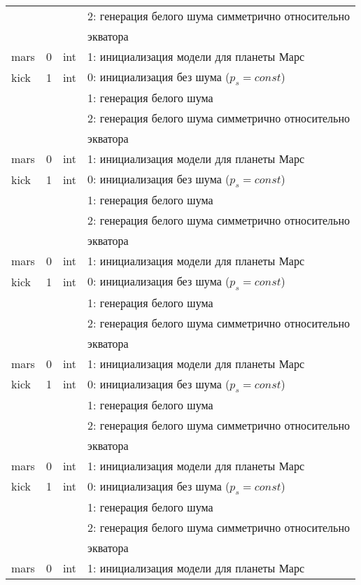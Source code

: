 \begin{longtable*}[c]{|l|c|l|l|}
      &   &     & 2: генерация белого шума симметрично относительно \\
  & & & экватора    \\
 mars & 0 & int & 1: инициализация модели для планеты Марс     \\
kick & 1 & int & 0: инициализация без шума (\(p_s = const\)) \\
      &   &     & 1: генерация белого шума                  \\
      &   &     & 2: генерация белого шума симметрично относительно \\
  & & & экватора    \\
 mars & 0 & int & 1: инициализация модели для планеты Марс     \\
kick & 1 & int & 0: инициализация без шума (\(p_s = const\)) \\
      &   &     & 1: генерация белого шума                  \\
      &   &     & 2: генерация белого шума симметрично относительно \\
  & & & экватора    \\
 mars & 0 & int & 1: инициализация модели для планеты Марс     \\
kick & 1 & int & 0: инициализация без шума (\(p_s = const\)) \\
      &   &     & 1: генерация белого шума                  \\
      &   &     & 2: генерация белого шума симметрично относительно \\
  & & & экватора    \\
 mars & 0 & int & 1: инициализация модели для планеты Марс     \\
kick & 1 & int & 0: инициализация без шума (\(p_s = const\)) \\
      &   &     & 1: генерация белого шума                  \\
      &   &     & 2: генерация белого шума симметрично относительно \\
  & & & экватора    \\
 mars & 0 & int & 1: инициализация модели для планеты Марс     \\
kick & 1 & int & 0: инициализация без шума (\(p_s = const\)) \\
      &   &     & 1: генерация белого шума                  \\
      &   &     & 2: генерация белого шума симметрично относительно \\
  & & & экватора    \\
 mars & 0 & int & 1: инициализация модели для планеты Марс     \\
 \hline
\end{longtable*}

